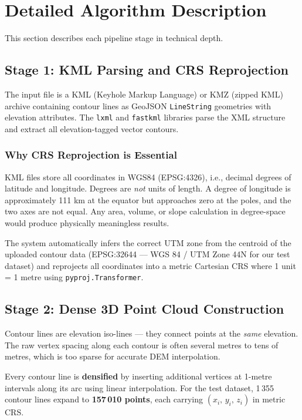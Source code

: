 \documentclass[12pt,a4paper]{article}
\begin{document}
\section{Detailed Algorithm Description}

This section describes each pipeline stage in technical depth.

\subsection{Stage 1: KML Parsing and CRS Reprojection}

The input file is a KML (Keyhole Markup Language) or KMZ (zipped KML) archive
containing contour lines as GeoJSON \texttt{LineString} geometries with elevation
attributes. The \texttt{lxml} and \texttt{fastkml} libraries parse the XML structure
and extract all elevation-tagged vector contours.

\subsubsection{Why CRS Reprojection is Essential}
KML files store all coordinates in WGS84 (EPSG:4326), i.e., decimal degrees of
latitude and longitude. Degrees are \emph{not} units of length. A degree of longitude
is approximately 111 km at the equator but approaches zero at the poles, and the two
axes are not equal. Any area, volume, or slope calculation in degree-space would produce
physically meaningless results.

The system automatically infers the correct UTM zone from the centroid of the uploaded
contour data (EPSG:32644 --- WGS 84 / UTM Zone 44N for our test dataset) and
reprojects all coordinates into a metric Cartesian CRS where 1 unit = 1 metre using
\texttt{pyproj.Transformer}.

\subsection{Stage 2: Dense 3D Point Cloud Construction}

Contour lines are elevation iso-lines --- they connect points at the \emph{same}
elevation. The raw vertex spacing along each contour is often several metres to tens of
metres, which is too sparse for accurate DEM interpolation.

Every contour line is \textbf{densified} by inserting additional vertices at 1-metre
intervals along its arc using linear interpolation. For the test dataset, 1\,355
contour lines expand to \textbf{157\,010 points}, each carrying $(x_i,\, y_i,\, z_i)$
in metric CRS.
\end{document}
